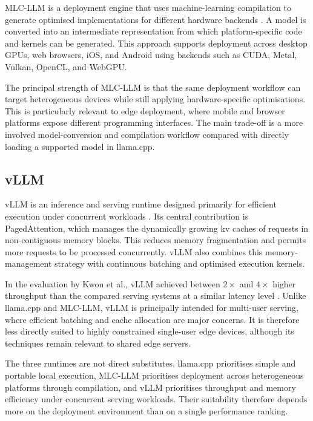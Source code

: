 MLC-LLM is a deployment engine that uses machine-learning compilation to
generate optimised implementations for different hardware backends
\cite{mlcllm2023}. A model is converted into an intermediate representation
from which platform-specific code and kernels can be generated. This approach
supports deployment across desktop GPUs, web browsers, iOS, and Android using
backends such as CUDA, Metal, Vulkan, OpenCL, and WebGPU.

The principal strength of MLC-LLM is that the same deployment workflow can
target heterogeneous devices while still applying hardware-specific
optimisations. This is particularly relevant to edge deployment, where mobile
and browser platforms expose different programming interfaces. The main
trade-off is a more involved model-conversion and compilation workflow compared
with directly loading a supported model in llama.cpp.

\subsection{vLLM}
\label{sec:vllm}

vLLM is an inference and serving runtime designed primarily for efficient
execution under concurrent workloads \cite{kwon2023pagedattention}. Its central
contribution is PagedAttention, which manages the dynamically growing
\ac{kv} caches of requests in non-contiguous memory blocks. This reduces memory
fragmentation and permits more requests to be processed concurrently. vLLM
also combines this memory-management strategy with continuous batching and
optimised execution kernels.

In the evaluation by Kwon et al., vLLM achieved between \(2\times\) and
\(4\times\) higher throughput than the compared serving systems at a similar
latency level \cite{kwon2023pagedattention}. Unlike llama.cpp and MLC-LLM,
vLLM is principally intended for multi-user serving, where efficient batching
and cache allocation are major concerns. It is therefore less directly suited
to highly constrained single-user edge devices, although its techniques remain
relevant to shared edge servers.

The three runtimes are not direct substitutes. llama.cpp prioritises simple
and portable local execution, MLC-LLM prioritises deployment across
heterogeneous platforms through compilation, and vLLM prioritises throughput
and memory efficiency under concurrent serving workloads. Their suitability
therefore depends more on the deployment environment than on a single
performance ranking.

